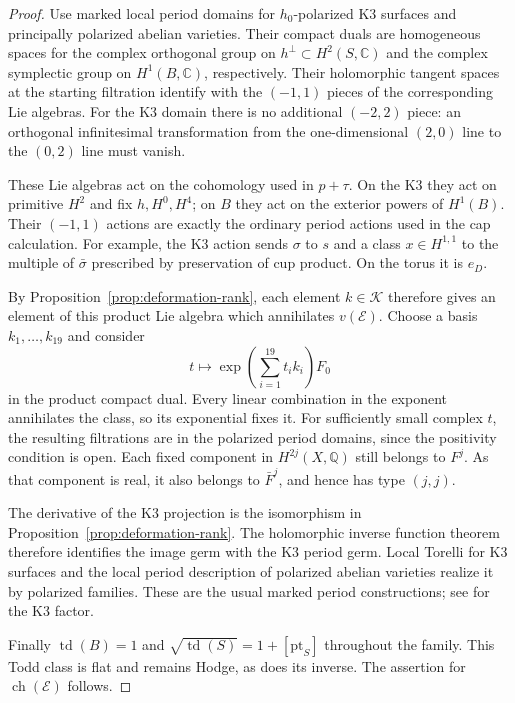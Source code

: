 \documentclass[11pt]{article}
\numberwithin{equation}{section}
\theoremstyle{definition}
\theoremstyle{remark}
\newcommand{\Q}{\mathbb Q}
\newcommand{\C}{\mathbb C}
\newcommand{\td}{\operatorname{td}}
\newcommand{\ch}{\operatorname{ch}}
\begin{document}
\begin{proof}
Use marked local period domains for $h_0$-polarized K3 surfaces
and principally polarized abelian varieties. Their compact duals
are homogeneous spaces for the complex orthogonal group on
$h^\perp\subset H^2(S,\C)$ and the complex symplectic group on
$H^1(B,\C)$, respectively. Their holomorphic tangent spaces at the
starting filtration identify with the $(-1,1)$ pieces of the
corresponding Lie algebras. For the K3 domain there is no additional
$(-2,2)$ piece: an orthogonal infinitesimal transformation from the
one-dimensional $(2,0)$ line to the $(0,2)$ line must vanish.

These Lie algebras act on the cohomology used in $p+\tau$. On the
K3 they act on primitive $H^2$ and fix $h,H^0,H^4$; on $B$ they
act on the exterior powers of $H^1(B)$. Their $(-1,1)$ actions
are exactly the ordinary period actions used in the cap calculation.
For example, the K3 action sends $\sigma$ to $s$ and a class
$x\in H^{1,1}$ to the multiple of $\bar\sigma$ prescribed by
preservation of cup product. On the torus it is $e_D$.

By Proposition~\ref{prop:deformation-rank}, each element $k\in \mathcal K$
therefore gives an element of this product Lie algebra which
annihilates $v(\mathcal E)$. Choose a basis $k_1,\ldots,k_{19}$
and consider
\[
 t\longmapsto
 \exp\left(\sum_{i=1}^{19}t_i k_i\right)F_0
\]
in the product compact dual. Every linear combination in the
exponent annihilates the class, so its exponential fixes it.
For sufficiently small complex $t$, the resulting filtrations are
in the polarized period domains, since the positivity condition
is open. Each fixed component in $H^{2j}(X,\Q)$ still belongs to
$F^j$. As that component is real, it also belongs to $\bar F^j$,
and hence has type $(j,j)$.

The derivative of the K3 projection is the isomorphism in
Proposition~\ref{prop:deformation-rank}. The holomorphic inverse
function theorem therefore identifies the image germ with the
K3 period germ. Local Torelli for K3 surfaces and the local period
description of polarized abelian varieties realize it by polarized
families. These are the usual marked period constructions; see
\cite[Chapter~6]{Huybrechts} for the K3 factor.

Finally $\td(B)=1$ and
$\sqrt{\td(S)}=1+[\mathrm{pt}_S]$ throughout the family. This
Todd class is flat and remains Hodge, as does its inverse. The
assertion for $\ch(\mathcal E)$ follows.
\end{proof}
\end{document}
